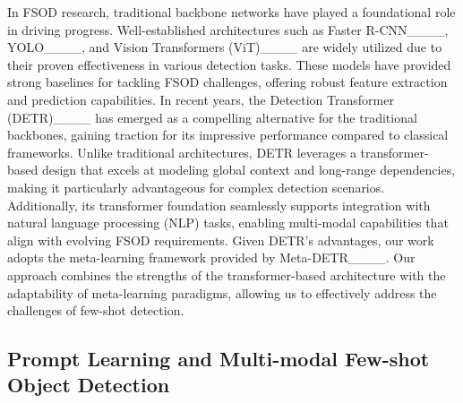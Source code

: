 In FSOD research, traditional backbone networks have played a foundational role in driving progress. Well-established architectures such as Faster R-CNN____, YOLO____, and Vision Transformers (ViT)____ are widely utilized due to their proven effectiveness in various detection tasks. These models have provided strong baselines for tackling FSOD challenges, offering robust feature extraction and prediction capabilities.
In recent years, the Detection Transformer (DETR)____ has emerged as a compelling alternative for the traditional backbones, gaining traction for its impressive performance compared to classical frameworks. Unlike traditional architectures, DETR leverages a transformer-based design that excels at modeling global context and long-range dependencies, making it particularly advantageous for complex detection scenarios. Additionally, its transformer foundation seamlessly supports integration with natural language processing (NLP) tasks, enabling multi-modal capabilities that align with evolving FSOD requirements.
Given DETR's advantages, our work adopts the meta-learning framework provided by Meta-DETR____. Our approach combines the strengths of the transformer-based architecture with the adaptability of meta-learning paradigms, allowing us to effectively address the challenges of few-shot detection.  

\subsection{Prompt Learning and Multi-modal Few-shot Object Detection}
\label{sec:MM-FSOD}

